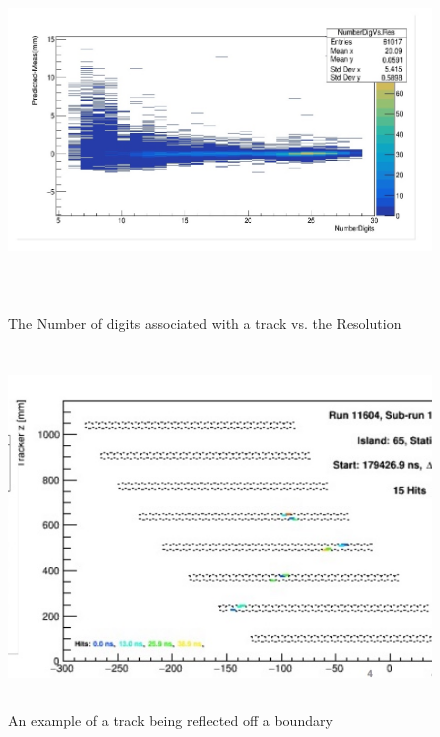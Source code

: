 \documentclass[./Thesis]{subfiles}
\begin{document}
\begin{figure}
	\centerline{\includegraphics[height=95mm]{NumDigitsVsRes.jpeg}}
	\caption[Number of Digits vs. Resolution]{ The Number of digits associated with a track vs. the Resolution}
	\label{fig:NumDigits}
\end{figure} 

\begin{figure}
	\centerline{\includegraphics[height=95mm]{ReflectedTrack.jpeg}}
	\caption[Reflected Track]{ An example of a track being reflected off a boundary}
	\label{fig:RefTrack}
\end{figure} 

	 
	 
\end{document}

